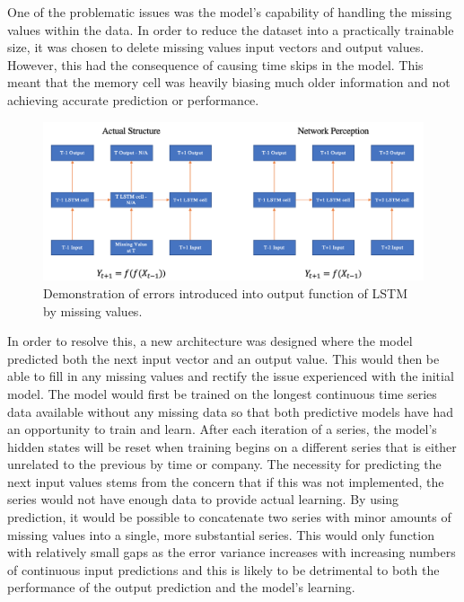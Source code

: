 \documentclass[10pt,onecolumn,letterpaper]{article}
\begin{document}
One of the problematic issues was the model's capability of handling the missing values within the data. In order to reduce the dataset into a practically trainable size, it was chosen to delete missing values input vectors and output values. However, this had the consequence of causing time skips in the model. This meant that the memory cell was heavily biasing much older information and not achieving accurate prediction or performance. 

\begin{figure}[!hbt!]
\centering
\includegraphics[width=14.5cm]{rnn_missingval_perception.png}
\caption{Demonstration of errors introduced into output function of LSTM by missing values.}
\end{figure}

In order to resolve this, a new architecture was designed where the model predicted both the next input vector and an output value. This would then be able to fill in any missing values and rectify the issue experienced with the initial model. The model would first be trained on the longest continuous time series data available without any missing data so that both predictive models have had an opportunity to train and learn. After each iteration of a series, the model's hidden states will be reset when training begins on a different series that is either unrelated to the previous by time or company. The necessity for predicting the next input values stems from the concern that if this was not implemented, the series would not have enough data to provide actual learning. By using prediction, it would be possible to concatenate two series with minor amounts of missing values into a single, more substantial series. This would only function with relatively small gaps as the error variance increases with increasing numbers of continuous input predictions and this is likely to be detrimental to both the performance of the output prediction and the model's learning.
\end{document}
